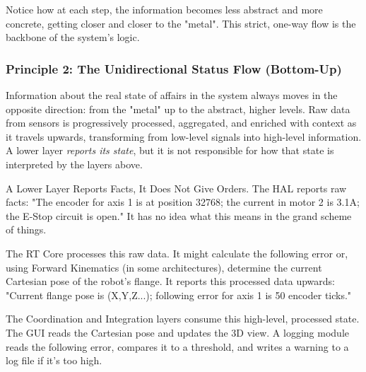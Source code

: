 Notice how at each step, the information becomes less abstract and more concrete, getting closer and closer to the "metal". This strict, one-way flow is the backbone of the system's logic.


\subsubsection{Principle 2: The Unidirectional Status Flow (Bottom-Up)}
\label{subsubsec:status_flow}

Information about the real state of affairs in the system always moves in the opposite direction: from the "metal" up to the abstract, higher levels. Raw data from sensors is progressively processed, aggregated, and enriched with context as it travels upwards, transforming from low-level signals into high-level information. A lower layer \textit{reports its state}, but it is not responsible for how that state is interpreted by the layers above.

\begin{principlebox}{A Lower Layer Reports Facts, It Does Not Give Orders.}
The HAL reports raw facts: "The encoder for axis 1 is at position 32768; the current in motor 2 is 3.1A; the E-Stop circuit is open." It has no idea what this means in the grand scheme of things.
    
The RT Core processes this raw data. It might calculate the following error or, using Forward Kinematics (in some architectures), determine the current Cartesian pose of the robot's flange. It reports this processed data upwards: "Current flange pose is (X,Y,Z...); following error for axis 1 is 50 encoder ticks."
    
The Coordination and Integration layers consume this high-level, processed state. The GUI reads the Cartesian pose and updates the 3D view. A logging module reads the following error, compares it to a threshold, and writes a warning to a log file if it's too high.
\end{principlebox}

